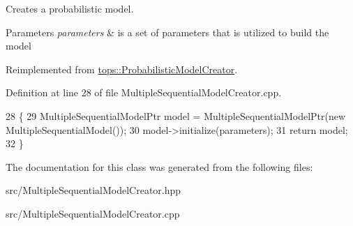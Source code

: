 Creates a probabilistic model. 


\begin{DoxyParams}{Parameters}
{\em parameters} & is a set of parameters that is utilized to build the model \\
\hline
\end{DoxyParams}


Reimplemented from \hyperlink{classtops_1_1ProbabilisticModelCreator_afed6c8ffa45fff446bdaa8b533da8f7c}{tops\+::\+Probabilistic\+Model\+Creator}.



Definition at line 28 of file Multiple\+Sequential\+Model\+Creator.\+cpp.


\begin{DoxyCode}
28                                                                                                            
         \{
29     MultipleSequentialModelPtr model = MultipleSequentialModelPtr(\textcolor{keyword}{new} MultipleSequentialModel());
30     model->initialize(parameters);
31     \textcolor{keywordflow}{return} model;
32   \}
\end{DoxyCode}


The documentation for this class was generated from the following files\+:\begin{DoxyCompactItemize}
\item 
src/Multiple\+Sequential\+Model\+Creator.\+hpp\item 
src/Multiple\+Sequential\+Model\+Creator.\+cpp\end{DoxyCompactItemize}
